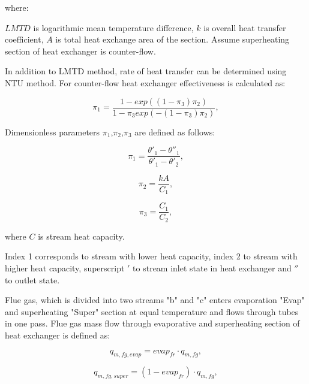 \documentclass{article}
\begin{document}
	where:
	
	\noindent
	$LMTD$ is logarithmic mean temperature difference, 
	$k$ is overall heat transfer coefficient,
	$A$ is total heat exchange area of the section. 
	Assume superheating section of heat exchanger is counter-flow.
	
	In addition to LMTD method, rate of heat transfer can be determined using NTU method. For counter-flow heat exchanger effectiveness is calculated as:
	
	\begin{equation}\label{eq:heat_exchanger_eff}
		\pi_1 = \frac{1 - exp((1-\pi_3)\pi_2)}{1-\pi_3exp(-(1-\pi_3)\pi_2)},
	\end{equation}
	
	Dimensionless parameters $\pi_1$,$\pi_2$,$\pi_3$ are defined as follows:
	
	\begin{equation}\label{eq:pi_params}
		\pi_1 = \frac{\theta'_1 - \theta''_1}{\theta'_1 - \theta'_2},
	\end{equation}
	
	\begin{equation}\label{eq:pi_params2}
		\pi_2 = \frac{kA}{C_1},
	\end{equation}
	
	\begin{equation}\label{eq:pi_params3}
		\pi_3 = \frac{C_1}{C_2},
	\end{equation}
	
	\noindent
	where $C$ is stream heat capacity.
	
	Index 1 corresponds to stream with lower heat capacity, index 2 to stream with higher heat capacity, superscript $'$ to stream inlet state in heat exchanger and $''$ to outlet state.
	
	Flue gas, which is divided into two streams "b" and "c" enters evaporation "Evap" and superheating "Super" section at equal temperature and flows through tubes in one pass. Flue gas mass flow through evaporative and superheating section of heat exchanger is defined as:
	
	\begin{equation}\label{eq:flue_gas_flow1}
		q_{m,fg,evap} = evap_{fr} \cdot q_{m,fg},
	\end{equation}
	
	\begin{equation}\label{eq:flue_gas_flow2}
		q_{m,fg,super} = (1-evap_{fr}) \cdot q_{m,fg},
	\end{equation}
	
\end{document}
